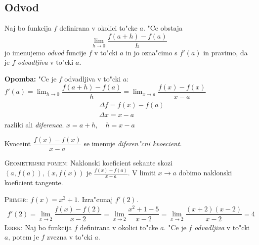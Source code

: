 \subsection{Odvod}
 Naj bo funkcija $f$ definirana v okolici to"cke $a$. "Ce obstaja
\begin{equation*}
\lim_{h \to 0} \dfrac{f(a + h) - f(a)}{h}
\end{equation*}
jo imenujemo \emph{odvod} funcije $f$ v to"cki $a$ in jo ozna"cimo s $f'(a)$ in pravimo, da je $f$ \emph{odvadljiva} v to"cki $a$.

\textbf{Opomba:} "Ce je $f$ odvadljiva v to"cki $a$: $f'(a) = \lim_{h \to 0} \dfrac{f(a + h) - f(a)}{h} = \lim_{x \to a} \dfrac{f(x) - f(x)}{x - a}$
\begin{gather*}
\begin{aligned}
&\Delta f = f(x) - f(a) \\
&\Delta x = x - a
\end{aligned}
\end{gather*}
razliki ali \emph{diferenca}. $x = a + h, \quad h = x-a$

Kvoceint $\dfrac{f(x) - f(x)}{x - a}$ se imenuje \emph{diferen"cni kvoecient}.

\textsc{Geometrijski pomen:} Naklonski koeficient sekante skozi $(a, f(a)), (x, f(x))$ je $\frac{f(x) - f(a)}{x-a}$. V limiti $x \to a$ dobimo naklonski koeficient tangente.

\textsc{Primer:} $f(x) = x^2 + 1$. Izra"cunaj $f'(2)$.
\begin{gather*}
f'(2) = \lim_{x \to 2} \dfrac{f(x) - f(2)}{x - 2} = \lim_{x \to 2} \dfrac{x^2 + 1 - 5}{x - 2} = \lim_{x \to 2} \dfrac{(x + 2)(x-2)}{x-2} = 4
\end{gather*}
%
\textsc{Izrek:} Naj bo funkcija $f$ definirana v okolici to"cke $a$. "Ce je $f$ \emph{odvadljiva} v to"cki $a$, potem je $f$ zvezna v to"cki $a$.

